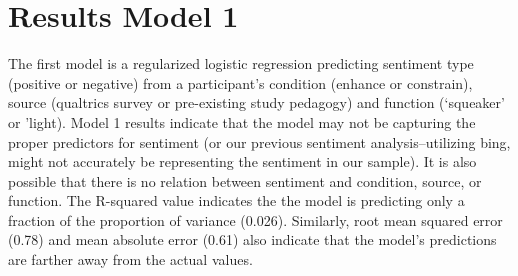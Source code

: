 \documentclass[
  english,
  man]{apa6}
\newenvironment{Shaded}{\begin{snugshade}}{\end{snugshade}}
\newcommand{\CommentTok}[1]{\textcolor[rgb]{0.56,0.35,0.01}{\textit{#1}}}
\newcommand{\DecValTok}[1]{\textcolor[rgb]{0.00,0.00,0.81}{#1}}
\newcommand{\FunctionTok}[1]{\textcolor[rgb]{0.00,0.00,0.00}{#1}}
\newcommand{\NormalTok}[1]{#1}
\newcommand{\OtherTok}[1]{\textcolor[rgb]{0.56,0.35,0.01}{#1}}
\newcommand{\SpecialCharTok}[1]{\textcolor[rgb]{0.00,0.00,0.00}{#1}}
\begin{document}
\begin{Shaded}
\end{Shaded}

\hypertarget{results-model-1}{%
\section{Results Model 1}\label{results-model-1}}

The first model is a regularized logistic regression predicting sentiment type
(positive or negative) from a participant's condition (enhance or constrain), source
(qualtrics survey or pre-existing study pedagogy) and function (`squeaker' or
'light). Model 1 results indicate that the model may not be capturing the proper
predictors for sentiment (or our previous sentiment analysis--utilizing bing, might
not accurately be representing the sentiment in our sample). It is also possible
that there is no relation between sentiment and condition, source, or function. The
R-squared value indicates the the model is predicting only a fraction of the
proportion of variance (0.026). Similarly, root mean squared error (0.78) and mean
absolute error (0.61) also indicate that the model's predictions are farther away
from the actual values.
\end{document}
